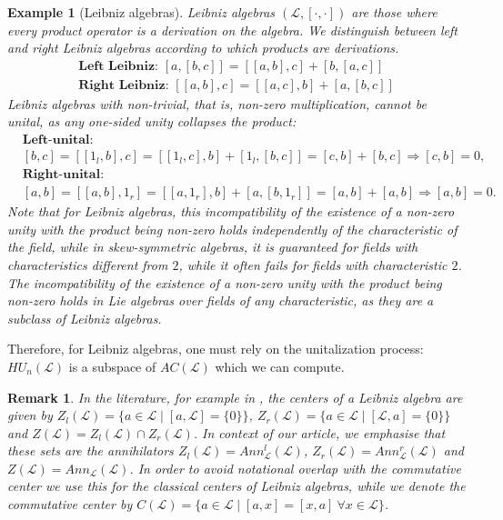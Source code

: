 \documentclass[12pt]{article}
\newtheorem{example}[theorem]{Example}
\newtheorem{remark}[theorem]{Remark}
\begin{document}
            \begin{example}[Leibniz algebras]\label{ssec:Leibniz}
			Leibniz algebras $(\mathcal{L},[\cdot,\cdot])$ are those where every product operator is a derivation on the algebra. We distinguish between left and right Leibniz algebras according to which products are derivations.
			\begin{align*}
				\textbf{Left Leibniz: } [a,[b,c]]=[[a,b],c]+[b,[a,c]]\\
				\textbf{Right Leibniz: } [[a,b],c]=[[a,c],b]+[a,[b,c]]
			\end{align*}
            Leibniz algebras with non-trivial, that is, non-zero multiplication,
            cannot be unital, as any one-sided unity collapses the product:
                \begin{align*}
            		&\textbf{Left-unital: }\\
            		& [b,c]=[[1_l,b],c]=[[1_l,c],b]+[1_l,[b,c]]=[c,b]+[b,c] \Longrightarrow [c,b]=0,\\
            		&\textbf{Right-unital: }\\
            		& [a,b]=[[a,b],1_r]=[[a,1_r],b]+[a,[b,1_r]]=[a,b]+[a,b]
            		\Rightarrow [a,b]=0.
            	\end{align*}
            Note that for Leibniz algebras, this incompatibility of the existence of a non-zero unity with the product being non-zero holds independently of the characteristic of the field, while in skew-symmetric algebras, it is guaranteed for fields with characteristics different from $2$, while it often fails for fields with characteristic $2$. The incompatibility of the existence of a non-zero unity with the product being non-zero holds in Lie algebras over fields of any characteristic, as they are a subclass of Leibniz algebras.
            \end{example}

			Therefore, for Leibniz algebras, one must rely on the unitalization process: $HU_n(\mathcal{L})$ is a subspace of $AC(\mathcal{L})$ which we can compute.

            \begin{remark}
            In the literature, for example in {\rm \cite{Man:LowDimLeib}}, the \textit{centers} of a Leibniz algebra are given by $Z_l(\mathcal{L})=\{a\in \mathcal{L}\mid [a,\mathcal{L}]=\{0\}\}$, $Z_r(\mathcal{\mathcal{L}})=\{a\in \mathcal{L}\mid [\mathcal{L},a]=\{0\}\}$ and $Z(\mathcal{L})=Z_l(\mathcal{L})\cap Z_r(\mathcal{L})$.
            In context of our article, we emphasise that these sets are the \textnormal{annihilators} $Z_l(\mathcal{L})=Ann_\mathcal{L}^l(\mathcal{L})$,  $Z_r(\mathcal{\mathcal{L}})=Ann_\mathcal{L}^r(\mathcal{L})$ and $Z(\mathcal{L})=Ann_\mathcal{L}(\mathcal{L})$. In order to avoid notational overlap with the commutative center we use this for the classical centers of Leibniz algebras, while we denote the commutative center by $C(\mathcal{L})=\{a\in\mathcal{L}\mid [a,x]=[x,a]\ \forall x\in\mathcal{L}\}$.
            \end{remark}
\end{document}
